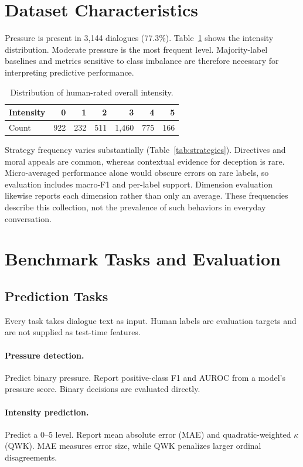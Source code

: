 \documentclass[11pt]{article}
\begin{document}
\section{Dataset Characteristics}
Pressure is present in 3,144 dialogues (77.3\%). Table~\ref{tab:intensity}
shows the intensity distribution. Moderate pressure is the most frequent
level. Majority-label baselines and metrics sensitive to class imbalance
are therefore necessary for interpreting predictive performance.

\begin{table}[t]
\centering\small
\begin{tabular}{@{}lrrrrrr@{}}
\toprule
Intensity & 0 & 1 & 2 & 3 & 4 & 5\\
\midrule
Count & 922 & 232 & 511 & 1,460 & 775 & 166\\
\bottomrule
\end{tabular}
\caption{Distribution of human-rated overall intensity.}
\label{tab:intensity}
\end{table}

Strategy frequency varies substantially (Table~\ref{tab:strategies}).
Directives and moral appeals are common, whereas contextual evidence for
deception is rare. Micro-averaged performance alone would obscure errors
on rare labels, so evaluation includes macro-F1 and per-label support.
Dimension evaluation likewise reports each dimension rather than only an
average. These frequencies describe this collection, not the prevalence
of such behaviors in everyday conversation.

\section{Benchmark Tasks and Evaluation}
\subsection{Prediction Tasks}
Every task takes dialogue text as input. Human labels are evaluation
targets and are not supplied as test-time features.
\paragraph{Pressure detection.}
Predict binary pressure. Report positive-class F1 and AUROC from a model's
pressure score. Binary decisions are evaluated directly.
\paragraph{Intensity prediction.}
Predict a 0--5 level. Report mean absolute error (MAE) and quadratic-weighted
$\kappa$ (QWK). MAE measures error size, while QWK penalizes larger ordinal
disagreements.
\end{document}
